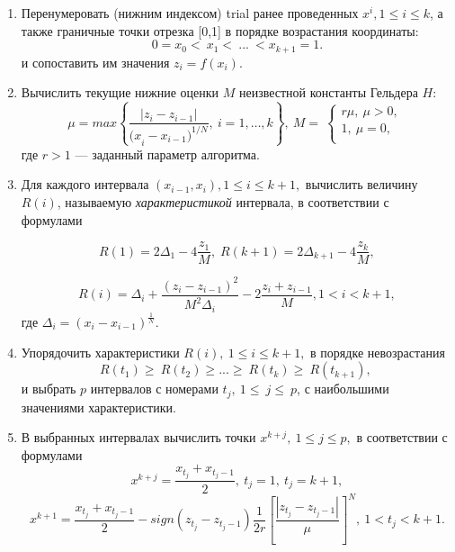 \documentclass{svproc}
\begin{document}
\begin{enumerate}

\item  Перенумеровать (нижним индексом) trial ранее проведенных  $x^i, 1\leq i\leq k$, а также граничные точки отрезка [0,1] в порядке возрастания координаты:
 \begin{equation}
\label{agp1_sort}
	0=x_0<\ x_1<\ ...\ <x_{k+1}=1.
	\end{equation}
	и сопоставить им значения $z_i=f(x_i)$. 
	
\item  Вычислить текущие нижние оценки $M$ неизвестной константы Гельдера $H$:
 \begin{equation}
\label{agp2_mu}
	\mu=max\left\{\frac{|z_i-z_{i-1}|}{{{(x}_i-x_{i-1})}^{1/N}},\ i=1,\ldots,k\right\},\ M=\ \left\{\begin{matrix}r\mu,\ \mu>0,\\1,\ \mu=0,\\\end{matrix}\right.\
	\end{equation}
где $r>1$ --- заданный параметр алгоритма.
   
\item  Для каждого интервала $(x_{i-1},x_i), 1\leq i\leq k+1,$ вычислить величину $R(i)$, называемую \textit{характеристикой} интервала, в соответствии с формулами

\begin{equation}
\label{agp3_R1}
R(1)=2\Delta_1-4\dfrac{z_1}{M}, \; R(k+1)=2\Delta_{k+1}-4\dfrac{z_k}{M},
\end{equation}

\begin{equation}
\label{agp3_Ri}
R(i)=\Delta_i+\dfrac{(z_i-z_{i-1})^2}{M^2\Delta_i}-2\dfrac{z_i+z_{i-1}}{M},1<i<k+1,
\end{equation}
где \(\Delta_i=(x_i-x_{i-1})^\frac{1}{N}\).
   
\item   Упорядочить характеристики $R\left(i\right),\ 1\leq i \leq k+1,$ в порядке невозрастания 
\begin{equation}
\label{agp4_R_sort}
	R\left(t_1\right)\geq\ R\left(t_2\right)\geq...\geq\ R\left(t_k\right)\geq\ R(t_{k+1}),\ 
\end{equation}	
и выбрать $p$ интервалов с номерами $t_j,\ 1\le\ j\le\ p$, с наибольшими значениями характеристики.

\item В выбранных интервалах вычислить точки $x^{k+j},\ 1\leq j\leq p,$ в соответствии с формулами
\begin{equation}
\label{agp5_x1}
	x^{k+j}=\frac{x_{t_j}+x_{t_j-1}}{2},\ t_j=1,\ t_j=k+1,
\end{equation}	
	\begin{equation}
\label{agp4_xi}	
	x^{k+1}=\frac{x_{t_j}+x_{t_j-1}}{2}-sign\left(z_{t_j}-z_{t_j-1}\right)\frac{1}{2r}\left[\frac{\left|z_{t_j}-z_{t_j-1}\right|}{\mu}\right]^N,\ 1<t_j<k+1.
\end{equation}	

\end{enumerate}
\end{document}
